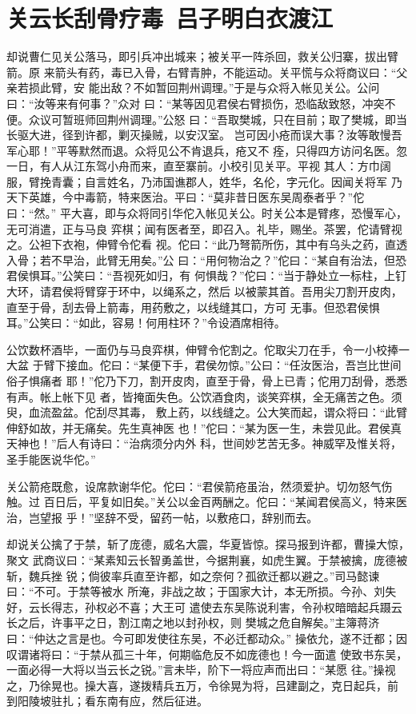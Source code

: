 \chapter{关云长刮骨疗毒~吕子明白衣渡江}

却说曹仁见关公落马，即引兵冲出城来；被关平一阵杀回，救关公归寨，拔出臂箭。原
来箭头有药，毒已入骨，右臂青肿，不能运动。关平慌与众将商议曰：“父亲若损此臂，安
能出敌？不如暂回荆州调理。”于是与众将入帐见关公。公问曰：“汝等来有何事？”众对
曰：“某等因见君侯右臂损伤，恐临敌致怒，冲突不便。众议可暂班师回荆州调理。”公怒
曰：“吾取樊城，只在目前；取了樊城，即当长驱大进，径到许都，剿灭操贼，以安汉室。
岂可因小疮而误大事？汝等敢慢吾军心耶！”平等默然而退。众将见公不肯退兵，疮又不
痊，只得四方访问名医。忽一日，有人从江东驾小舟而来，直至寨前。小校引见关平。平视
其人：方巾阔服，臂挽青囊；自言姓名，乃沛国谯郡人，姓华，名伦，字元化。因闻关将军
乃天下英雄，今中毒箭，特来医治。平曰：“莫非昔日医东吴周泰者乎？”佗曰：“然。”
平大喜，即与众将同引华佗入帐见关公。时关公本是臂疼，恐慢军心，无可消遣，正与马良
弈棋；闻有医者至，即召入。礼毕，赐坐。茶罢，佗请臂视之。公袒下衣袍，伸臂令佗看
视。佗曰：“此乃弩箭所伤，其中有乌头之药，直透入骨；若不早治，此臂无用矣。”公
曰：“用何物治之？”佗曰：“某自有治法，但恐君侯惧耳。”公笑曰：“吾视死如归，有
何惧哉？”佗曰：“当于静处立一标柱，上钉大环，请君侯将臂穿于环中，以绳系之，然后
以被蒙其首。吾用尖刀割开皮肉，直至于骨，刮去骨上箭毒，用药敷之，以线缝其口，方可
无事。但恐君侯惧耳。”公笑曰：“如此，容易！何用柱环？”令设酒席相待。

公饮数杯酒毕，一面仍与马良弈棋，伸臂令佗割之。佗取尖刀在手，令一小校捧一大盆
于臂下接血。佗曰：“某便下手，君侯勿惊。”公曰：“任汝医治，吾岂比世间俗子惧痛者
耶！”佗乃下刀，割开皮肉，直至于骨，骨上已青；佗用刀刮骨，悉悉有声。帐上帐下见
者，皆掩面失色。公饮酒食肉，谈笑弈棋，全无痛苦之色。须臾，血流盈盆。佗刮尽其毒，
敷上药，以线缝之。公大笑而起，谓众将曰：“此臂伸舒如故，并无痛矣。先生真神医
也！”佗曰：“某为医一生，未尝见此。君侯真天神也！”后人有诗曰：“治病须分内外
科，世间妙艺苦无多。神威罕及惟关将，圣手能医说华佗。”

关公箭疮既愈，设席款谢华佗。佗曰：“君侯箭疮虽治，然须爱护。切勿怒气伤触。过
百日后，平复如旧矣。”关公以金百两酬之。佗曰：“某闻君侯高义，特来医治，岂望报
乎！”坚辞不受，留药一帖，以敷疮口，辞别而去。

却说关公擒了于禁，斩了庞德，威名大震，华夏皆惊。探马报到许都，曹操大惊，聚文
武商议曰：“某素知云长智勇盖世，今据荆襄，如虎生翼。于禁被擒，庞德被斩，魏兵挫
锐；倘彼率兵直至许都，如之奈何？孤欲迁都以避之。”司马懿谏曰：“不可。于禁等被水
所淹，非战之故；于国家大计，本无所损。今孙、刘失好，云长得志，孙权必不喜；大王可
遣使去东吴陈说利害，令孙权暗暗起兵蹑云长之后，许事平之日，割江南之地以封孙权，则
樊城之危自解矣。”主簿蒋济曰：“仲达之言是也。今可即发使往东吴，不必迁都动众。”
操依允，遂不迁都；因叹谓诸将曰：“于禁从孤三十年，何期临危反不如庞德也！今一面遣
使致书东吴，一面必得一大将以当云长之锐。”言未毕，阶下一将应声而出曰：“某愿
往。”操视之，乃徐晃也。操大喜，遂拨精兵五万，令徐晃为将，吕建副之，克日起兵，前
到阳陵坡驻扎；看东南有应，然后征进。

